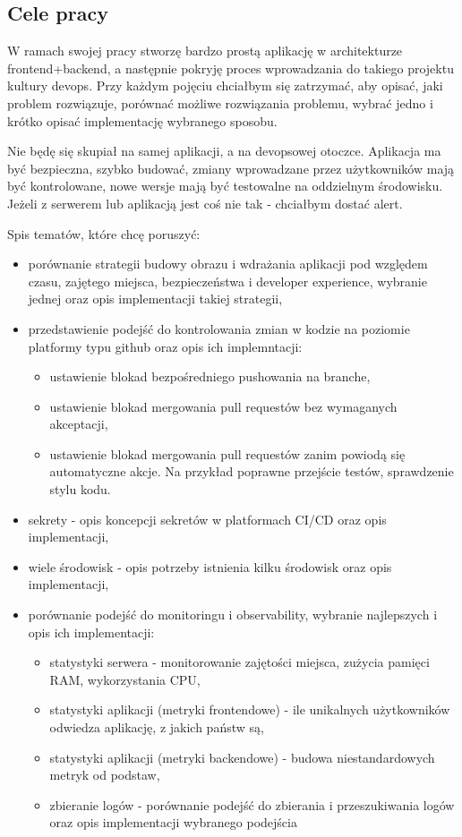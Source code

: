 \documentclass{article}
\begin{document}
\subsection{Cele pracy}

W ramach swojej pracy stworzę bardzo prostą aplikację w architekturze frontend+backend, a następnie pokryję proces wprowadzania do takiego projektu kultury devops. Przy każdym pojęciu chciałbym się zatrzymać, aby opisać, jaki problem rozwiązuje, porównać możliwe rozwiązania problemu, wybrać jedno i krótko opisać implementację wybranego sposobu.

Nie będę się skupiał na samej aplikacji, a na devopsowej otoczce. Aplikacja ma być bezpieczna, szybko budować, zmiany wprowadzane przez użytkowników mają być kontrolowane, nowe wersje mają być testowalne na oddzielnym środowisku. Jeżeli z serwerem lub aplikacją jest coś nie tak - chciałbym dostać alert.


Spis tematów, które chcę poruszyć:
\begin{itemize}
    \item porównanie strategii budowy obrazu i wdrażania aplikacji pod względem czasu, zajętego miejsca, bezpieczeństwa i developer experience, wybranie jednej oraz opis implementacji takiej strategii,
    \item przedstawienie podejść do kontrolowania zmian w kodzie na poziomie platformy typu github oraz opis ich implemntacji:
    \begin{itemize}
        \item ustawienie blokad bezpośredniego pushowania na branche,
        \item ustawienie blokad mergowania pull requestów bez wymaganych akceptacji,
        \item ustawienie blokad mergowania pull requestów zanim powiodą się automatyczne akcje. Na przykład poprawne przejście testów, sprawdzenie stylu kodu.
    \end{itemize}
    \item sekrety - opis koncepcji sekretów w platformach CI/CD oraz opis implementacji,
    \item wiele środowisk - opis potrzeby istnienia kilku środowisk oraz opis implementacji,
    \item porównanie podejść do monitoringu i observability, wybranie najlepszych i opis ich implementacji:
    \begin{itemize}
        \item statystyki serwera - monitorowanie zajętości miejsca, zużycia pamięci RAM, wykorzystania CPU,
        \item statystyki aplikacji (metryki frontendowe) - ile unikalnych użytkowników odwiedza aplikację, z jakich państw są,
        \item statystyki aplikacji (metryki backendowe) - budowa niestandardowych metryk od podstaw,
        \item zbieranie logów - porównanie podejść do zbierania i przeszukiwania logów oraz opis implementacji wybranego podejścia
    \end{itemize}
\end{itemize}
\end{document}
